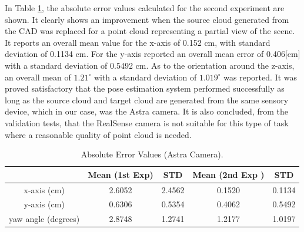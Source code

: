 In Table \ref{absolute}, the absolute error values calculated for the second experiment are shown. It clearly shows an improvement when the source cloud generated from the CAD was replaced for a point cloud representing a partial view of the scene. It reports an overall mean value for the x-axis of 0.152 cm,  with standard deviation of 0.1134 cm. For the y-axis reported an overall mean error of 0.406[cm] with a standard deviation of 0.5492 cm. As to the orientation around the z-axis, an overall mean of $1.21^{\circ}$ with a standard deviation of $1.019^{\circ}$ was reported. It was proved satisfactory that the pose estimation system performed successfully as long as the source cloud and target cloud are generated from the same sensory device, which in our case, was the Astra camera. It is also concluded, from the validation tests, that the RealSense camera is not suitable for this type of task where a reasonable quality of point cloud is needed.  


\begin{table}[ht]
\renewcommand{\arraystretch}{1.3}
\caption{Absolute Error Values (Astra Camera).}
\label{absolute}
\centering
\begin{tabular}{|c||c||c||c||c|}
\hline
  & Mean (1st Exp)& STD &  Mean (2nd Exp )& STD \\
\hline
x-axis (cm) & 2.6052 & 2.4562 & 0.1520 & 0.1134\\
\hline
y-axis (cm) & 0.6306 & 0.5354 & 0.4062 & 0.5492\\
\hline
yaw angle (degrees)& 2.8748 & 1.2741 & 1.2177 & 1.0197\\
\hline
\hline
\end{tabular}
\end{table}


